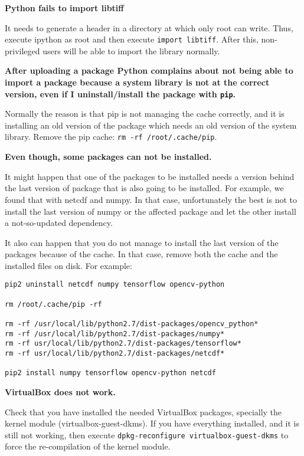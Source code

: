 \documentclass[a4paper,12pt]{article}
\begin{document}
\textbf{Python fails to import libtiff}

It needs to generate a header in a directory at which only root can write. Thus, execute ipython as root and then execute {\tt import libtiff}. After this, non-privileged users will be able to import the library normally.
\vspace{0.5cm}

\textbf{After uploading a package Python complains about not being able to import a package because a system library is not at the correct version, even if I uninstall/install the package with {\tt pip}.}

Normally the reason is that pip is not managing the cache correctly, and it is installing an old version of the package which needs an old version of the system library. Remove the pip cache: {\tt rm -rf /root/.cache/pip}.
\vspace{0.5cm}

\textbf{Even though, some packages can not be installed.}

It might happen that one of the packages to be installed needs a version behind the last version of package that is also going to be installed. For example, we found that with netcdf and numpy. In that case, unfortunately the best is not to install the last version of numpy or the affected package and let the other install a not-so-updated dependency.

It also can happen that you do not manage to install the last version of the packages because of the cache. In that case, remove both the cache and the installed files on disk. For example:

\begin{verbatim}
pip2 uninstall netcdf numpy tensorflow opencv-python

rm /root/.cache/pip -rf

rm -rf /usr/local/lib/python2.7/dist-packages/opencv_python*
rm -rf /usr/local/lib/python2.7/dist-packages/numpy*
rm -rf usr/local/lib/python2.7/dist-packages/tensorflow*
rm -rf usr/local/lib/python2.7/dist-packages/netcdf*

pip2 install numpy tensorflow opencv-python netcdf
\end{verbatim}
\vspace{0.5cm}

\textbf{VirtualBox does not work.}

Check that you have installed the needed VirtualBox packages, specially the kernel module (virtualbox-guest-dkms).
If you have everything installed, and it is still not working, then execute {\tt dpkg-reconfigure virtualbox-guest-dkms} to force the re-compilation of the kernel module.
\end{document}
